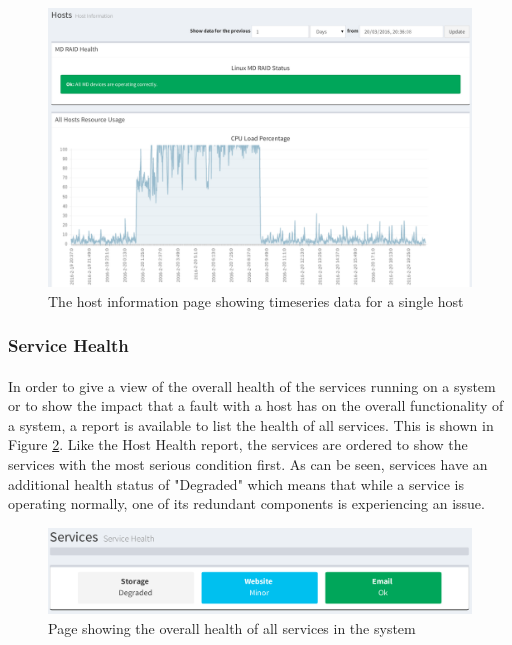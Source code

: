 \documentclass[bsc,logo,twoside]{infthesis}
\begin{document}
\begin{figure}[H]
	\centering
	\caption{The host information page showing timeseries data for a single host}
	\label{host-information}
	\includegraphics[scale=0.43]{assets/screenshots/host-information.pdf}
\end{figure}

\subsubsection{Service Health}
\paragraph*{}
	In order to give a view of the overall health of the services running on a
	system or to show the impact that a fault with a host has on the overall
	functionality of a system, a report is available to list the health of all
	services.  This is shown in Figure \ref{service-health-index}. Like the
	Host Health report, the services are ordered to show the services with the most
	serious condition first.  As can be seen, services have an additional health
	status of "Degraded" which means that while a service is operating normally,
	one of its redundant components is experiencing an issue.

\begin{figure}[H]
	\centering
	\caption{Page showing the overall health of all services in the system}
	\label{service-health-index}
	\includegraphics[scale=0.6]{assets/screenshots/service-health-index.pdf}
\end{figure}
\end{document}
